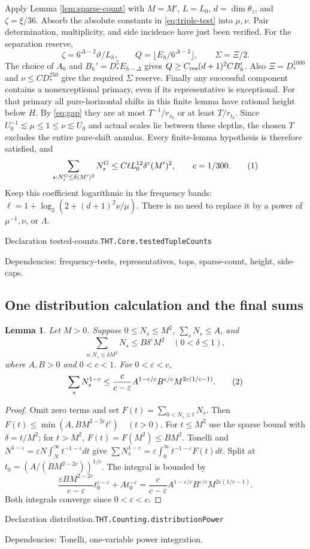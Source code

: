 \documentclass[11pt]{article}
\newtheorem{lemma}[theorem]{Lemma}
\theoremstyle{definition}
\newcommand{\eqtag}[1]{\refstepcounter{equation}\tag{\theequation}\label{#1}}
\numberwithin{equation}{section}
\newcommand{\bp}[3]{\par\smallskip\begingroup\footnotesize
\noindent\hypertarget{bp:#1}{\textsf{Declaration #1.}}\quad\nolinkurl{#2}\par
\noindent\textsf{Dependencies:} #3.\par\endgroup\smallskip}
\begin{document}
Apply Lemma \ref{lem:sparse-count} with $M=M'$, $L=L_0$, $d=\dim\theta_z$, and $\zeta=\xi/36$. Absorb the absolute constants in \eqref{eq:triple-test} into $\mu,\nu$. Pair determination, multiplicity, and side incidence have just been verified. For the separation reserve,
\[
 \zeta=6^{\Delta-2}\vartheta/L_h,\qquad Q=\lfloor E_h/6^{\Delta-2}\rfloor,\qquad\Sigma=\Xi/2.
\]
The choice of $A_0$ and $B_h'=D_*^5E_{h-\Delta}$ gives $Q\ge C_{\rm res}(d+1)^2CB_h'$. Also $\Xi=D_*^{1000}$ and $\nu\le CD_*^{250}$ give the required $\Sigma$ reserve. Finally any successful component contains a nonexceptional primary, even if its representative is exceptional. For that primary all pure-horizontal shifts in this finite lemma have rational height below $H$. By \eqref{eq:gap} they are at most $T^{-1}/r_{v_b}$ or at least $T/r_{t_b}$. Since $U_0^{-1}\lesssim\mu\le1\le\nu\lesssim U_0$ and actual scales lie between these depths, the chosen $T$ excludes the entire pure-shift annulus. Every finite-lemma hypothesis is therefore satisfied, and
\[
 \sum_{s:N_s^G\le\delta(M')^2}N_s^G
 \le C\ell L_0^{12}\delta^c(M')^2,\qquad c=1/300.
 \eqtag{eq:applied-sparse}
\]
Keep this coefficient logarithmic in the frequency bands: $\ell=1+\log_2(2+(d+1)^2\nu/\mu)$. There is no need to replace it by a power of $\mu^{-1},\nu$, or $\Lambda$.

\bp{tested-counts}{THT.Core.testedTupleCounts}{frequency-tests, representatives, tops, sparse-count, height, side-caps}

\subsection*{One distribution calculation and the final sums}
\begin{lemma}\label{lem:distribution}
Let $M>0$. Suppose $0\le N_s\le M^2$, $\sum_sN_s\le A$, and
\[
 \sum_{s:N_s\le\delta M^2}N_s\le B\delta^cM^2\quad(0<\delta\le1),
\]
where $A,B>0$ and $0<c<1$. For $0<\varepsilon<c$,
\[
 \sum_sN_s^{1-\varepsilon}
 \le\frac{c}{c-\varepsilon}A^{1-\varepsilon/c}B^{\varepsilon/c}
 M^{2\varepsilon(1/c-1)}.
 \eqtag{eq:distribution}
\]
\end{lemma}
\begin{proof}
Omit zero terms and set $F(t)=\sum_{0<N_s\le t}N_s$. Then $F(t)\le\min(A,BM^{2-2c}t^c)\quad(t>0)$. For $t\le M^2$ use the sparse bound with $\delta=t/M^2$; for $t>M^2$, $F(t)=F(M^2)\le BM^2$. Tonelli and $N^{1-\varepsilon}=\varepsilon N\int_N^\infty t^{-1-\varepsilon}dt$ give $\sum N_s^{1-\varepsilon}=\varepsilon\int_0^\infty t^{-1-\varepsilon}F(t)dt$. Split at $t_0=(A/(BM^{2-2c}))^{1/c}$. The integral is bounded by
\[
 \frac{\varepsilon BM^{2-2c}}{c-\varepsilon}t_0^{c-\varepsilon}
 +At_0^{-\varepsilon}
 =\frac{c}{c-\varepsilon}A^{1-\varepsilon/c}B^{\varepsilon/c}M^{2\varepsilon(1/c-1)}.
\]
Both integrals converge since $0<\varepsilon<c$.
\end{proof}
\bp{distribution}{THT.Counting.distributionPower}{Tonelli, one-variable power integration}
\end{document}
